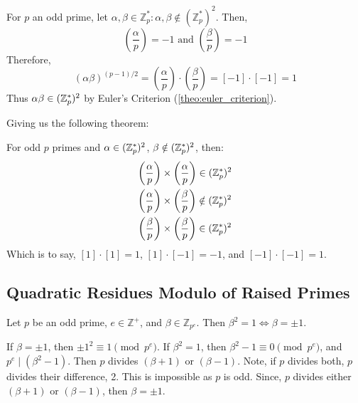 \newpage

\begin{Proof} 

    For \( p \) an odd prime, let \( \alpha, \beta \in \mathbb{Z}_p^*: \alpha,\beta \notin (\mathbb{Z}_p^*)^2 \). Then,
    \[
        \left(\frac{\alpha}{p}\right) = -1 \text{ and } \left(\frac{\beta}{p}\right) = -1
    \]
    \noindent
    Therefore,
    \[
        (\alpha\beta)^{(p-1)/2}=\left(\frac{\alpha}{p}\right)\cdot\left(\frac{\beta}{p}\right) = [-1]\cdot[-1] = 1
    \]
    \noindent
    Thus $\alpha\beta\in(\mathbb{Z}_p^*)^2$ by Euler's Criterion (\ref{theo:euler_criterion}).
\end{Proof}

\noindent
Giving us the following theorem:
\begin{theo}
    
        \label{theo:quadratic_residues_product}

        For odd \( p \) primes and $\alpha\in(\mathbb{Z}_p^*)^2$, $\beta\notin(\mathbb{Z}_p^*)^2$, then:
        \begin{align*}
            \left(\frac{\alpha}{p}\right) &\times \left(\frac{\alpha}{p}\right)\in(\mathbb{Z}_p^*)^2  \\
            \left(\frac{\alpha}{p}\right) &\times \left(\frac{\beta}{p}\right)\notin(\mathbb{Z}_p^*)^2 \\
            \left(\frac{\beta}{p}\right) &\times \left(\frac{\beta}{p}\right)\in(\mathbb{Z}_p^*)^2
        \end{align*}
        \noindent
        Which is to say, $[1]\cdot[1]=1$, $[1]\cdot[-1]=-1$, and $[-1]\cdot[-1]=1$.
\end{theo}

\subsection{Quadratic Residues Modulo of Raised Primes}

\begin{theo}

    Let \( p \) be an odd prime, \( e\in\mathbb{Z^+}\), and \( \beta \in \mathbb{Z}_{p^e} \). 
    Then \( \beta^2 = 1 \Longleftrightarrow \beta = \pm 1 \).
\end{theo}
\begin{Proof}
    If $\beta=\pm1$, then $\pm1^2\equiv 1\pmod{p^e}$. If $\beta^2=1$, then $\beta^2-1\equiv 0\pmod{p^e}$,
    and $p^e\mid(\beta^2-1)$. Then $p$ divides $(\beta+1)$ or $(\beta-1)$. Note, if $p$ divides both, $p$ divides their difference, 2. This is impossible as $p$ is odd. Since, $p$ divides either $(\beta+1)$ or $(\beta-1)$, then $\beta=\pm1$.
\end{Proof}

